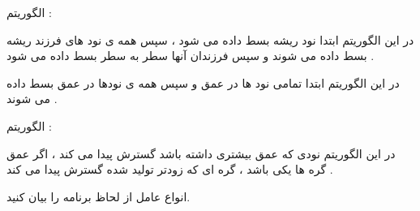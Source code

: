 \documentclass[12pt]{article}
\begin{document}
\begin{tcolorbox}
الگوریتم 
  : 
 
 در این الگوریتم ابتدا نود ریشه بسط داده می شود ، سپس همه ی نود های فرزند ریشه بسط داده می شوند و سپس فرزندان آنها سطر به سطر بسط داده می شود .
 
 در این الگوریتم ابتدا تمامی نود ها در عمق 
 و سپس همه ی نودها  در عمق
 بسط داده می شوند .
 
 
 \vspace{20pt}
 
 الگوریتم
   : 
  
  در این الگوریتم نودی که عمق بیشتری داشته باشد گسترش پیدا می کند ، اگر عمق گره ها یکی باشد ، گره ای که زودتر تولید شده گسترش پیدا می کند .

\end{tcolorbox}


\newpage
\vspace{20pt}
\noindent
انواع عامل از لحاظ برنامه را بیان کنید.
\end{document}

